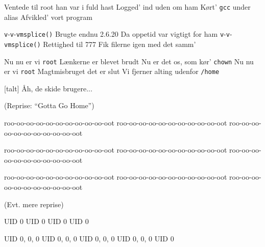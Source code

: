 \documentclass[a4paper,11pt]{article}
\begin{document}
\begin{song}
 Ventede til root han var i fuld hast
Logged' ind uden om ham
Kørt' \texttt{gcc} under alias
Afvikled' vort program

 \texttt{v}-\texttt{v}-\texttt{vmsplice()}
Brugte endnu 2.6.20
Da oppetid var vigtigt for ham
\texttt{v}-\texttt{v}-\texttt{vmsplice()}
Rettighed til 777
Fik filerne igen med det samm'

 Nu nu er vi \texttt{root}
Lænkerne er blevet brudt
Nu er det os, som kør' \texttt{chown}
Nu nu er vi \texttt{root}
Magtmisbruget det er slut
Vi fjerner alting udenfor \texttt{/home}

[talt] Åh, de skide brugere...

(Reprise: ``Gotta Go Home'')

 roo-oo-oo-oo-oo-oo-oo-oo-oo-oo-oot
roo-oo-oo-oo-oo-oo-oo-oo-oo-oo-oot
roo-oo-oo-oo-oo-oo-oo-oo-oo-oo-oot

 roo-oo-oo-oo-oo-oo-oo-oo-oo-oo-oot
roo-oo-oo-oo-oo-oo-oo-oo-oo-oo-oot
roo-oo-oo-oo-oo-oo-oo-oo-oo-oo-oot

 roo-oo-oo-oo-oo-oo-oo-oo-oo-oo-oot
roo-oo-oo-oo-oo-oo-oo-oo-oo-oo-oot
roo-oo-oo-oo-oo-oo-oo-oo-oo-oo-oot

(Evt. mere reprise)

 UID 0
UID 0
UID 0
UID 0

 UID 0, 0, 0
UID 0, 0, 0
UID 0, 0, 0
UID 0, 0, 0
UID 0

\end{song}
\end{document}
